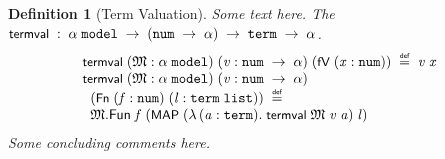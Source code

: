 \documentclass[letterpaper]{article}
\newtheorem{defn}{Definition}
\renewcommand{\HOLConst}[1]{{\textsf{\upshape\small #1}}}
\renewcommand{\HOLinline}[1]{\ensuremath{#1}}
\newenvironment{holmath}{\begin{displaymath}\begin{array}{l}}{\end{array}\end{displaymath}\ignorespacesafterend}
\begin{document}
\begin{defn}[Term Valuation]
Some text here.  The $\HOLinline{\HOLConst{termval}}\;:\;\HOLinline{\ensuremath{\alpha}\;\HOLTyOp{model}\;\ensuremath{\rightarrow}\;(\HOLTyOp{num}\;\ensuremath{\rightarrow}\;\ensuremath{\alpha})\;\ensuremath{\rightarrow}\;\HOLTyOp{term}\;\ensuremath{\rightarrow}\;\ensuremath{\alpha}}$.
\begin{holmath}
  \HOLConst{termval}\;(\HOLFreeVar{\ensuremath{\mathfrak{M}}} :\ensuremath{\alpha}\;\HOLTyOp{model})\;(\HOLFreeVar{v} :\HOLTyOp{num}\;\ensuremath{\rightarrow}\;\ensuremath{\alpha})\;(\HOLConst{fV}\;(\HOLFreeVar{x} :\HOLTyOp{num}))\;\HOLSymConst{\HOLTokenDefEquality{}}\;\HOLFreeVar{v}\;\HOLFreeVar{x}\\
\HOLConst{termval}\;(\HOLFreeVar{\ensuremath{\mathfrak{M}}} :\ensuremath{\alpha}\;\HOLTyOp{model})\;(\HOLFreeVar{v} :\HOLTyOp{num}\;\ensuremath{\rightarrow}\;\ensuremath{\alpha})\\
\;\;(\HOLConst{Fn}\;(\HOLFreeVar{f} :\HOLTyOp{num})\;(\HOLFreeVar{l} :\HOLTyOp{term}\;\HOLTyOp{list}))\;\HOLSymConst{\HOLTokenDefEquality{}}\\
\;\;\HOLFreeVar{\ensuremath{\mathfrak{M}}}.\HOLFieldName{Fun}\;\HOLFreeVar{f}\;(\HOLConst{MAP}\;(\HOLTokenLambda{}(\HOLBoundVar{a} :\HOLTyOp{term}).\;\HOLConst{termval}\;\HOLFreeVar{\ensuremath{\mathfrak{M}}}\;\HOLFreeVar{v}\;\HOLBoundVar{a})\;\HOLFreeVar{l})
\end{holmath}
Some concluding comments here.
\end{defn}
\end{document}
